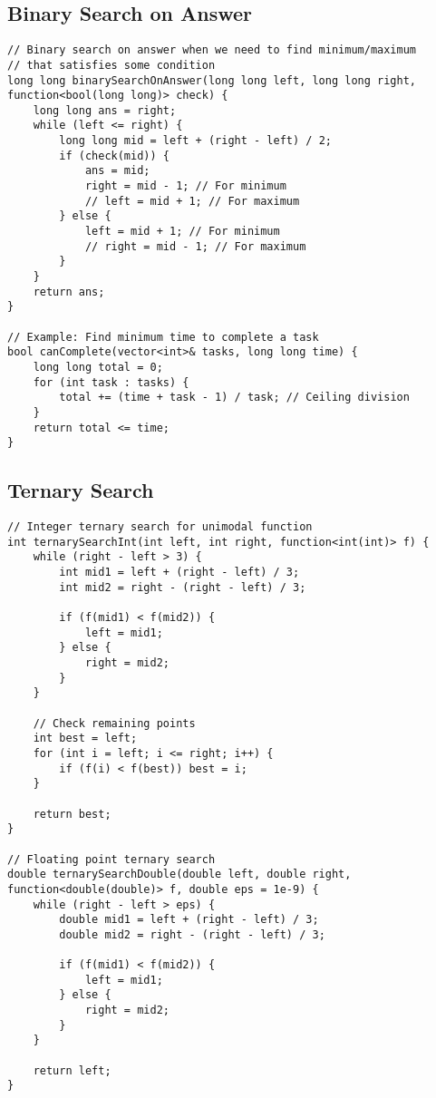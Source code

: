 \documentclass[11pt,a4paper]{article}
\begin{document}
\newpage

\subsection{Binary Search on Answer}
\begin{lstlisting}
// Binary search on answer when we need to find minimum/maximum
// that satisfies some condition
long long binarySearchOnAnswer(long long left, long long right, function<bool(long long)> check) {
    long long ans = right;
    while (left <= right) {
        long long mid = left + (right - left) / 2;
        if (check(mid)) {
            ans = mid;
            right = mid - 1; // For minimum
            // left = mid + 1; // For maximum
        } else {
            left = mid + 1; // For minimum
            // right = mid - 1; // For maximum
        }
    }
    return ans;
}

// Example: Find minimum time to complete a task
bool canComplete(vector<int>& tasks, long long time) {
    long long total = 0;
    for (int task : tasks) {
        total += (time + task - 1) / task; // Ceiling division
    }
    return total <= time;
}
\end{lstlisting}

\newpage
        
\subsection{Ternary Search}
\begin{lstlisting}
// Integer ternary search for unimodal function
int ternarySearchInt(int left, int right, function<int(int)> f) {
    while (right - left > 3) {
        int mid1 = left + (right - left) / 3;
        int mid2 = right - (right - left) / 3;
        
        if (f(mid1) < f(mid2)) {
            left = mid1;
        } else {
            right = mid2;
        }
    }
    
    // Check remaining points
    int best = left;
    for (int i = left; i <= right; i++) {
        if (f(i) < f(best)) best = i;
    }
    
    return best;
}

// Floating point ternary search
double ternarySearchDouble(double left, double right, function<double(double)> f, double eps = 1e-9) {
    while (right - left > eps) {
        double mid1 = left + (right - left) / 3;
        double mid2 = right - (right - left) / 3;
        
        if (f(mid1) < f(mid2)) {
            left = mid1;
        } else {
            right = mid2;
        }
    }
    
    return left;
}
\end{lstlisting}
\end{document}
